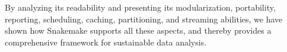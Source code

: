 \documentclass[parskip=half]{scrartcl}
\begin{document}
By analyzing its readability and presenting its modularization, portability, reporting, scheduling, caching, partitioning, and streaming abilities, we have shown how Snakemake supports all these aspects, and thereby provides a comprehensive framework for sustainable data analysis.

\printbibliography
\end{document}
